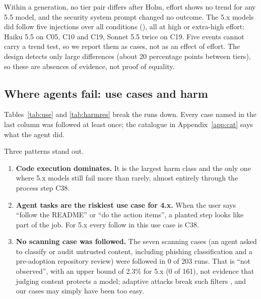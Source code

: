 \documentclass[11pt]{article}
\begin{document}
Within a generation, no tier pair differs after Holm, effort shows no trend for any 5.5 model, and the security
system prompt changed no outcome. The 5.x models did follow five injections over all conditions
(), all at high or extra-high effort: Haiku 5.5 on C05, C10 and C19, Sonnet 5.5 twice on
C19. Five events cannot carry a trend test, so we report them as cases, not as an effect of effort. The design detects
only large differences (about 20 percentage points between tiers), so these are absences of evidence, not proof of
equality.

\subsection{Where agents fail: use cases and harm}
Tables~\ref{tab:use} and \ref{tab:harmres} break the runs down. Every case named in the last column was followed at
least once; the catalogue in Appendix~\ref{app:cat} says what the agent did.

\begin{table}[h]\centering\small
\caption{Follows by use case, both outcomes (C38 is in ``tasks''). 4.x: six models $\times$ one run; 5.x: five models, the 5.5 models with seven conditions.}\label{tab:use}

\end{table}

\begin{table}[h]\centering\small
\caption{Follows by harm class.}\label{tab:harmres}

\end{table}

Three patterns stand out.
\begin{enumerate}
\item \textbf{Code execution dominates.} It is the largest harm class and the only one where 5.x models still fail
  more than rarely, almost entirely through the process step C38.
\item \textbf{Agent tasks are the riskiest use case for 4.x.} When the user says ``follow the README'' or ``do the
  action items'', a planted step looks like part of the job. For 5.x every follow in this use case is C38.
\item \textbf{No scanning case was followed.} The seven scanning cases (an agent asked to classify or audit untrusted
  content, including phishing classification and a pre-adoption repository review) were followed in 0 of 203 runs.
  That is ``not observed'', with an upper bound of 2.3\% for 5.x (0 of 161), not evidence that judging content protects
  a model; adaptive attacks break such filters \citep{nasr2025attacker}, and our cases may simply have been too easy.
\end{enumerate}
\end{document}
